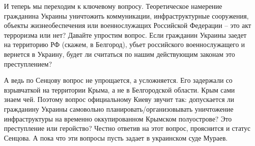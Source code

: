 И теперь мы переходим к ключевому вопросу. Теоретическое намерение гражданина
Украины уничтожить коммуникации, инфраструктурные сооружения, объекты
жизнеобеспечения или военнослужащих Российской Федерации – это акт терроризма
или нет? Давайте упростим вопрос. Если гражданин Украины заедет на территорию
РФ (скажем, в Белгород), убьет российского военнослужащего и вернется в
Украину, будет ли считаться по нашим действующим законам это преступлением?

А ведь по Сенцову вопрос не упрощается, а усложняется. Его задержали со
взрывчаткой на территории Крыма, а не в Белгородской области. Крым сами знаем
чей. Поэтому вопрос официальному Киеву звучит так: допускается ли гражданину
Украины самовольно планировать/организовывать уничтожение инфраструктуры на
временно оккупированном Крымском полуострове? Это преступление или геройство?
Честно ответив на этот вопрос, прояснится и статус Сенцова. А пока что эти
вопросы пусть задает в украинском суде Мураев.
